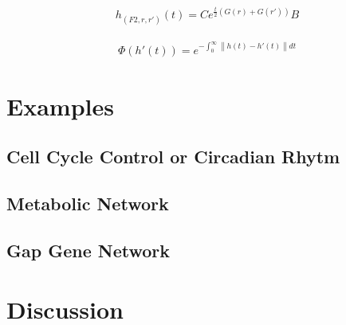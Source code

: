 \documentclass[9 pt]{article}
\newcommand{\1}{\mathbbm{1}}
\begin{document}
\begin{multicols}{2}
      \begin{align*}
        h_{(F2,r, r')}(t) = C e^{\frac{t}{2} \left( G(r) + G(r') \right)} B
      \end{align*}

      \begin{align*}
        \Phi(h'(t) ) = e^{- \int_{0}^{\infty} \left\lVert h(t) - h'(t) \right\rVert dt}
      \end{align*}


  \section*{Examples}
    \subsection*{Cell Cycle Control or Circadian Rhytm}

    \subsection*{Metabolic Network}

    \subsection*{Gap Gene Network}

    \section*{Discussion}


%
\end{multicols}
\end{document}
